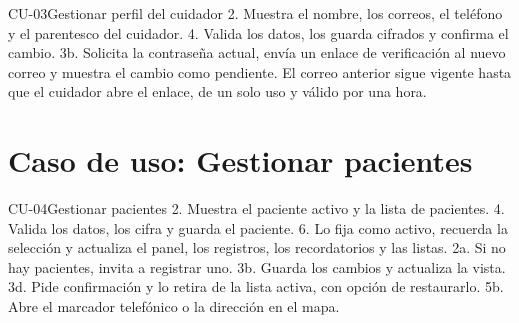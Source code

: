 \begin{table}[H]
\centering
\caption{Especificación del caso de uso CU-03.}
\label{tab:cu-03}
\begin{especificacioncu}{CU-03}{Gestionar perfil del cuidador}
           {2. Muestra el nombre, los correos, el teléfono y el parentesco del cuidador.}
           {4. Valida los datos, los guarda cifrados y confirma el cambio.}
    \cufinflujo
           {3b. Solicita la contraseña actual, envía un enlace de verificación al nuevo correo y muestra el cambio como pendiente. El correo anterior sigue vigente hasta que el cuidador abre el enlace, de un solo uso y válido por una hora.}
    \cufinflujo
\end{especificacioncu}
\end{table}

\section*{Caso de uso: Gestionar pacientes}

\begin{table}[H]
\centering
\caption{Especificación del caso de uso CU-04.}
\label{tab:cu-04}
\begin{especificacioncu}{CU-04}{Gestionar pacientes}
           {2. Muestra el paciente activo y la lista de pacientes.}
           {4. Valida los datos, los cifra y guarda el paciente.}
           {6. Lo fija como activo, recuerda la selección y actualiza el panel, los registros, los recordatorios y las listas.}
    \cufinflujo
    \cupaso{}
           {2a. Si no hay pacientes, invita a registrar uno.}
           {3b. Guarda los cambios y actualiza la vista.}
           {3d. Pide confirmación y lo retira de la lista activa, con opción de restaurarlo.}
           {5b. Abre el marcador telefónico o la dirección en el mapa.}
    \cufinflujo
\end{especificacioncu}
\end{table}

